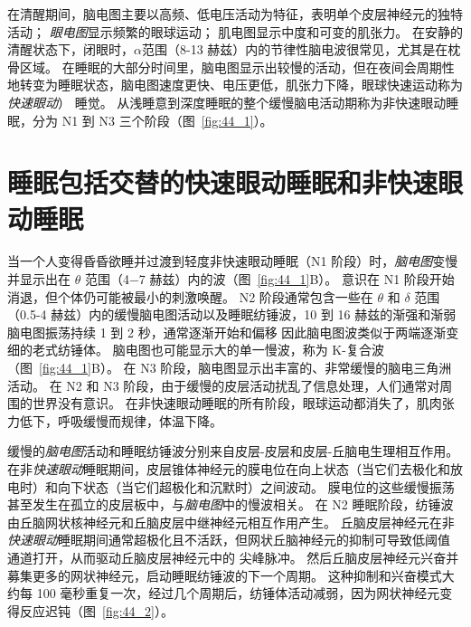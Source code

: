 在清醒期间，脑电图主要以高频、低电压活动为特征，表明单个皮层神经元的独特活动；
\textit{眼电图}显示频繁的眼球运动；
肌电图显示中度和可变的肌张力。
在安静的清醒状态下，闭眼时，$ \alpha $范围（8-13 赫兹）内的节律性脑电波很常见，尤其是在枕骨区域。
在睡眠的大部分时间里，脑电图显示出较慢的活动，但在夜间会周期性地转变为睡眠状态，脑电图速度更快、电压更低，肌张力下降，眼球快速运动称为\textit{快速眼动}） 睡觉。
从浅睡意到深度睡眠的整个缓慢脑电活动期称为非快速眼动睡眠，分为 N1 到 N3 三个阶段（图~\ref{fig:44_1}）。



\section{睡眠包括交替的快速眼动睡眠和非快速眼动睡眠}

当一个人变得昏昏欲睡并过渡到轻度非快速眼动睡眠（N1 阶段）时，\textit{脑电图}变慢并显示出在 $ \theta $ 范围（4−7 赫兹）内的波（图~\ref{fig:44_1}B）。
意识在 N1 阶段开始消退，但个体仍可能被最小的刺激唤醒。
N2 阶段通常包含一些在 $ \theta $ 和 $ \delta $ 范围（0.5-4 赫兹）内的缓慢脑电图活动以及睡眠纺锤波，10 到 16 赫兹的渐强和渐弱脑电图振荡持续 1 到 2 秒，通常逐渐开始和偏移 因此脑电图波类似于两端逐渐变细的老式纺锤体。
脑电图也可能显示大的单一慢波，称为 K-复合波（图~\ref{fig:44_1}B）。
在 N3 阶段，脑电图显示出丰富的、非常缓慢的脑电三角洲活动。
在 N2 和 N3 阶段，由于缓慢的皮层活动扰乱了信息处理，人们通常对周围的世界没有意识。
在非快速眼动睡眠的所有阶段，眼球运动都消失了，肌肉张力低下，呼吸缓慢而规律，体温下降。


缓慢的\textit{脑电图}活动和睡眠纺锤波分别来自皮层-皮层和皮层-丘脑电生理相互作用。
在非\textit{快速眼动}睡眠期间，皮层锥体神经元的膜电位在向上状态（当它们去极化和放电时）和向下状态（当它们超极化和沉默时）之间波动。
膜电位的这些缓慢振荡甚至发生在孤立的皮层板中，与\textit{脑电图}中的慢波相关。
在 N2 睡眠阶段，纺锤波由丘脑网状核神经元和丘脑皮层中继神经元相互作用产生。
丘脑皮层神经元在非\textit{快速眼动}睡眠期间通常超极化且不活跃，但网状丘脑神经元的抑制可导致低阈值  通道打开，从而驱动丘脑皮层神经元中的  尖峰脉冲。
然后丘脑皮层神经元兴奋并募集更多的网状神经元，启动睡眠纺锤波的下一个周期。
这种抑制和兴奋模式大约每 100 毫秒重复一次，经过几个周期后，纺锤体活动减弱，因为网状神经元变得反应迟钝（图~\ref{fig:44_2}）。


